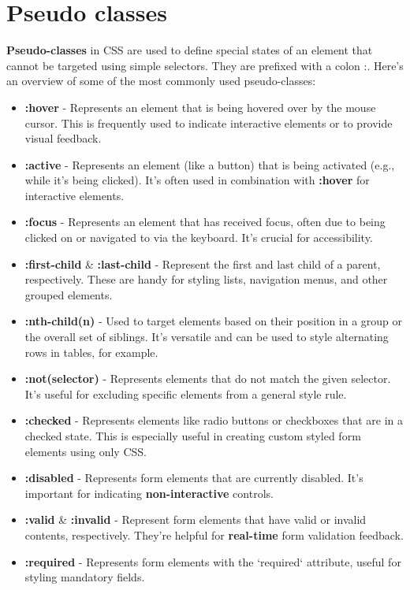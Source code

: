 \documentclass{report}
\begin{document}
    \section{\LARGE Pseudo classes}
    \bigbreak \noindent 
    \begin{concept}
       \textbf{Pseudo-classes} in CSS are used to define special states of an element that cannot be targeted using simple selectors. They are prefixed with a colon :. Here's an overview of some of the most commonly used pseudo-classes: 
    \end{concept}
    \bigbreak \noindent 
    \begin{itemize}
        \item \textbf{:hover} - Represents an element that is being hovered over by the mouse cursor. This is frequently used to indicate interactive elements or to provide visual feedback.
        \item \textbf{:active} - Represents an element (like a button) that is being activated (e.g., while it's being clicked). It's often used in combination with \textbf{:hover} for interactive elements.
        \item \textbf{:focus} - Represents an element that has received focus, often due to being clicked on or navigated to via the keyboard. It's crucial for accessibility.
        \item \textbf{:first-child} \& \textbf{:last-child} - Represent the first and last child of a parent, respectively. These are handy for styling lists, navigation menus, and other grouped elements.
        \item \textbf{:nth-child(n)} - Used to target elements based on their position in a group or the overall set of siblings. It's versatile and can be used to style alternating rows in tables, for example.
        \item \textbf{:not(selector)} - Represents elements that do not match the given selector. It's useful for excluding specific elements from a general style rule.
        \item \textbf{:checked} - Represents elements like radio buttons or checkboxes that are in a checked state. This is especially useful in creating custom styled form elements using only CSS.
        \item \textbf{:disabled} - Represents form elements that are currently disabled. It's important for indicating \textbf{non-interactive} controls.
        \item \textbf{:valid} \& \textbf{:invalid} - Represent form elements that have valid or invalid contents, respectively. They're helpful for \textbf{real-time} form validation feedback.
        \item \textbf{:required} - Represents form elements with the `required` attribute, useful for styling mandatory fields.
    \end{itemize}
\end{document}
